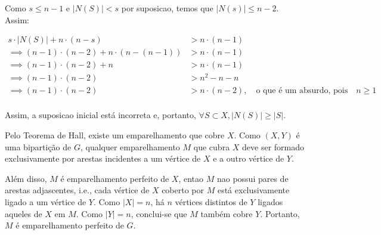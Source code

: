 \documentclass{article}
\begin{document}
 Como  $s \leq n - 1$ e  $|N(S)| < s$ por suposicao, temos que $|N(s)| \leq n - 2$. Assim:
 
  \begin{align*}
 	s \cdot |N(S)| + n \cdot (n - s) &> n \cdot (n - 1) \\
 	\implies (n-1)\cdot (n-2) + n \cdot (n - (n-1)) &> n \cdot (n - 1) \\
 	 \implies (n-1)\cdot (n-2) + n &> n \cdot (n - 1) \\
 	\implies (n-1)\cdot (n-2) &> n^2 - n - n \\
 	 \implies (n-1)\cdot (n-2) &> n \cdot (n - 2), \quad \text{o que é um absurdo, pois} \quad n \geq 1\\
 \end{align*}
 
Assim, a suposicao inicial está incorreta e, portanto, $\forall S \subset X, |N(S)| \geq |S|$. 

Pelo Teorema de Hall, existe um emparelhamento que cobre $X$. Como $(X, Y)$ é uma bipartição de $G$, qualquer emparelhamento $M$ que cubra $X$ deve ser formado exclusivamente por arestas incidentes a um vértice de $X$ e a outro vértice de $Y$.

Além disso, $M$ é emparelhamento perfeito de $X$, entao $M$ nao possui pares de arestas adjascentes, i.e., cada vértice de $X$ coberto por $M$ está exclusivamente ligado a um vértice de $Y$. Como $|X| = n$, há $n$ vértices distintos de $Y$ ligados aqueles de $X$ em $M$. Como $|Y| = n$, conclui-se que $M$ também cobre $Y$. Portanto, $M$ é emparelhamento perfeito de $G$.

\clearpage
\end{document}
